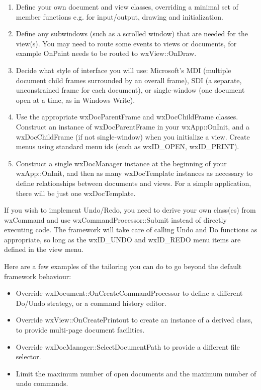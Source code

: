 \begin{enumerate}\itemsep=0pt
\item Define your own document and view classes, overriding a minimal set of
member functions e.g. for input/output, drawing and initialization.
\item Define any subwindows
(such as a scrolled window) that are needed for the view(s). You may need to route some events
to views or documents, for example OnPaint needs to be routed to wxView::OnDraw.
\item Decide what style of interface you will use: Microsoft's MDI (multiple
document child frames surrounded by an overall frame), SDI (a separate, unconstrained frame
for each document), or single-window (one document open at a time, as in Windows Write).
\item Use the appropriate wxDocParentFrame and wxDocChildFrame classes. Construct an instance
of wxDocParentFrame in your wxApp::OnInit, and a wxDocChildFrame (if not single-window) when
you initialize a view. Create menus using standard menu ids (such as wxID\_OPEN, wxID\_PRINT).
\item Construct a single wxDocManager instance at the beginning of your wxApp::OnInit, and then
as many wxDocTemplate instances as necessary to define relationships between documents and
views. For a simple application, there will be just one wxDocTemplate.
\end{enumerate}

If you wish to implement Undo/Redo, you need to derive your own class(es) from wxCommand
and use wxCommandProcessor::Submit instead of directly executing code. The framework will
take care of calling Undo and Do functions as appropriate, so long as the wxID\_UNDO and
wxID\_REDO menu items are defined in the view menu.

Here are a few examples of the tailoring you can do to go beyond the default framework
behaviour:

\begin{itemize}\itemsep=0pt
\item Override wxDocument::OnCreateCommandProcessor to define a different Do/Undo strategy,
or a command history editor.
\item Override wxView::OnCreatePrintout to create an instance of a derived \rtfsp
class, to provide multi-page document facilities.
\item Override wxDocManager::SelectDocumentPath to provide a different file selector.
\item Limit the maximum number of open documents and the maximum number of undo commands.
\end{itemize}

